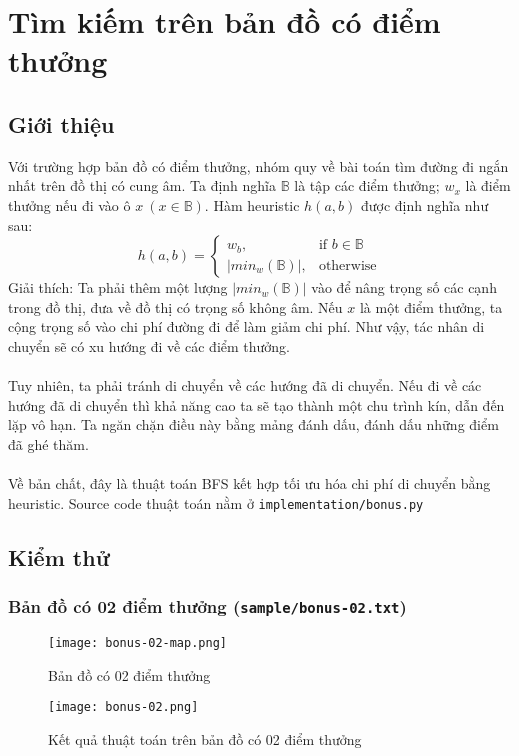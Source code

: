 \documentclass{article}
\begin{document}
\section{Tìm kiếm trên bản đồ có điểm thưởng}
\subsection{Giới thiệu}
Với trường hợp bản đồ có điểm thưởng, nhóm quy về bài toán tìm đường đi ngắn nhất trên đồ thị có cung âm. Ta định nghĩa $\mathbb{B}$ là tập các điểm thưởng; $w_x$ là điểm thưởng nếu đi vào ô $x\ (x \in \mathbb{B})$. Hàm heuristic $h(a, b)$ được định nghĩa như sau:
$$
h(a, b) = \begin{cases}
w_b, & \text{if $b \in \mathbb{B}$}\\
|min_w(\mathbb{B})|, & \text{otherwise}
\end{cases}
$$
Giải thích: Ta phải thêm một lượng $|min_w(\mathbb{B})|$ vào để nâng trọng số các cạnh trong đồ thị, đưa về đồ thị có trọng số không âm. Nếu $x$ là một điểm thưởng, ta cộng trọng số vào chi phí đường đi để làm giảm chi phí. Như vậy, tác nhân di chuyển sẽ có xu hướng đi về các điểm thưởng.
\\\\
Tuy nhiên, ta phải tránh di chuyển về các hướng đã di chuyển. Nếu đi về các hướng đã di chuyển thì khả năng cao ta sẽ tạo thành một chu trình kín, dẫn đến lặp vô hạn. Ta ngăn chặn điều này bằng mảng đánh dấu, đánh dấu những điểm đã ghé thăm.
\\\\
Về bản chất, đây là thuật toán BFS kết hợp tối ưu hóa chi phí di chuyển bằng heuristic. Source code thuật toán nằm ở \texttt{implementation/bonus.py}
\subsection{Kiểm thử}
\subsubsection{Bản đồ có 02 điểm thưởng (\texttt{sample/bonus-02.txt})}
\begin{figure}[H]
	\centering
	\texttt{[image: bonus-02-map.png]}
	\caption{Bản đồ có 02 điểm thưởng}
\end{figure}

\begin{figure}[H]
	\centering
	\texttt{[image: bonus-02.png]}
	\caption{Kết quả thuật toán trên bản đồ có 02 điểm thưởng}
\end{figure}
\end{document}
